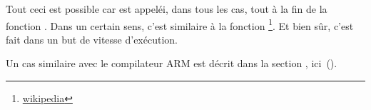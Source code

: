 \newcommand{\URLSJ}{\href{http://go.yurichev.com/17121}{wikipedia}}

Tout ceci est possible car \printf est appeléi, dans tous les cas, tout à la fin
de la fonction \ttf.
Dans un certain sens, c'est similaire à la fonction \footnote{\URLSJ}.
Et bien sûr, c'est fait dans un but de vitesse d'exécution.

Un cas similaire avec le compilateur ARM est décrit dans la section \q{\PrintfSeveralArgumentsSectionName},
ici~().



